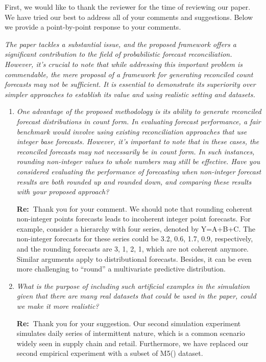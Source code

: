 \documentclass[11pt,a4paper]{article}
\newcommand{\RE}[2][Re:~]{{\color{blue}\textbf{#1}#2}}
\begin{document}
\RE[]{First, we would like to thank the reviewer for the time of reviewing our paper. We have tried our best to address all of your comments and suggestions. Below we provide a point-by-point response to your comments.}


\textit{The paper tackles a substantial issue, and the proposed framework offers a significant contribution to the field of probabilistic forecast reconciliation. However, it's crucial to note that while addressing this important problem is commendable, the mere proposal of a framework for generating reconciled count forecasts may not be sufficient. It is essential to demonstrate its superiority over simpler approaches to establish its value and using realistic setting and datasets.}

\begin{enumerate}
  \item \textit{One advantage of the proposed methodology is its ability to generate reconciled forecast distributions in count form. In evaluating forecast performance, a fair benchmark would involve using existing reconciliation approaches that use integer base forecasts. However, it's important to note that in these cases, the reconciled forecasts may not necessarily be in count form. In such instances, rounding non-integer values to whole numbers may still be effective. Have you considered evaluating the performance of forecasting when non-integer forecast results are both rounded up and rounded down, and comparing these results with your proposed approach?}

  \RE{Thank you for your comment. We should note that rounding coherent non-integer points forecasts leads to incoherent integer point forecasts. For example, consider a hierarchy with four series, denoted by Y=A+B+C. The non-integer forecasts for these series could be 3.2, 0.6, 1.7, 0.9, respectively, and the rounding forecasts are 3, 1, 2, 1, which are not coherent anymore. Similar arguments apply to distributional forecasts. Besides, it can be even more challenging to ``round'' a multivariate predictive distribution.}


  \item \textit{What is the purpose of including such artificial examples in the simulation given that there are many real datasets that could be used in the paper, could we make it more realistic?}

  \RE{Thank you for your suggestion. Our second simulation experiment simulates daily series of intermittent nature, which is a common scenario widely seen in supply chain and retail. Furthermore, we have replaced our second empirical experiment with a subset of M5(\citealp{makridakisM5AccuracyCompetition2022}) dataset.}


\end{enumerate}
\end{document}
